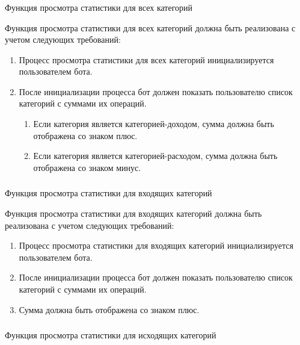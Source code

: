 \subsubsection{} Функция просмотра статистики для всех категорий
\label{sec:domain:specification:showallstats}

Функция просмотра статистики для всех категорий должна быть реализована с учетом следующих требований:

\begin{enumerate}
	\item Процесс просмотра статистики для всех категорий инициализируется пользователем бота.
	\item После инициализации процесса бот должен показать пользователю список категорий с суммами их операций.
	\begin{enumerate}
		\item Если категория является категорией-доходом, сумма должна быть отображена со знаком плюс.
		\item Если категория является категорией-расходом, сумма должна быть отображена со знаком минус.
	\end{enumerate}
\end{enumerate}

\subsubsection{} Функция просмотра статистики для входящих категорий
\label{sec:domain:specification:showincomestats}

Функция просмотра статистики для входящих категорий должна быть реализована с учетом следующих требований:

\begin{enumerate}
	\item Процесс просмотра статистики для входящих категорий инициализируется пользователем бота.
	\item После инициализации процесса бот должен показать пользователю список категорий с суммами их операций.
	\item Сумма должна быть отображена со знаком плюс.
\end{enumerate}

\subsubsection{} Функция просмотра статистики для исходящих категорий
\label{sec:domain:specification:showexpensestats}

